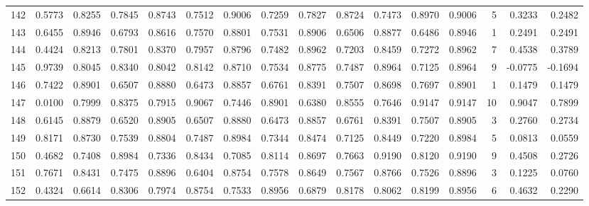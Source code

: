 \begin{tabular}{lrrrrrrrrrrrrrrr}
142 &      0.5773 &  0.8255 &  0.7845 &  0.8743 &  0.7512 &  0.9006 &  0.7259 &  0.7827 &  0.8724 &  0.7473 &   0.8970 &     0.9006 &      5 &                    0.3233 &                     0.2482 \\
143 &      0.6455 &  0.8946 &  0.6793 &  0.8616 &  0.7570 &  0.8801 &  0.7531 &  0.8906 &  0.6506 &  0.8877 &   0.6486 &     0.8946 &      1 &                    0.2491 &                     0.2491 \\
144 &      0.4424 &  0.8213 &  0.7801 &  0.8370 &  0.7957 &  0.8796 &  0.7482 &  0.8962 &  0.7203 &  0.8459 &   0.7272 &     0.8962 &      7 &                    0.4538 &                     0.3789 \\
145 &      0.9739 &  0.8045 &  0.8340 &  0.8042 &  0.8142 &  0.8710 &  0.7534 &  0.8775 &  0.7487 &  0.8964 &   0.7125 &     0.8964 &      9 &                   -0.0775 &                    -0.1694 \\
146 &      0.7422 &  0.8901 &  0.6507 &  0.8880 &  0.6473 &  0.8857 &  0.6761 &  0.8391 &  0.7507 &  0.8698 &   0.7697 &     0.8901 &      1 &                    0.1479 &                     0.1479 \\
147 &      0.0100 &  0.7999 &  0.8375 &  0.7915 &  0.9067 &  0.7446 &  0.8901 &  0.6380 &  0.8555 &  0.7646 &   0.9147 &     0.9147 &     10 &                    0.9047 &                     0.7899 \\
148 &      0.6145 &  0.8879 &  0.6520 &  0.8905 &  0.6507 &  0.8880 &  0.6473 &  0.8857 &  0.6761 &  0.8391 &   0.7507 &     0.8905 &      3 &                    0.2760 &                     0.2734 \\
149 &      0.8171 &  0.8730 &  0.7539 &  0.8804 &  0.7487 &  0.8984 &  0.7344 &  0.8474 &  0.7125 &  0.8449 &   0.7220 &     0.8984 &      5 &                    0.0813 &                     0.0559 \\
150 &      0.4682 &  0.7408 &  0.8984 &  0.7336 &  0.8434 &  0.7085 &  0.8114 &  0.8697 &  0.7663 &  0.9190 &   0.8120 &     0.9190 &      9 &                    0.4508 &                     0.2726 \\
151 &      0.7671 &  0.8431 &  0.7475 &  0.8896 &  0.6404 &  0.8754 &  0.7578 &  0.8649 &  0.7567 &  0.8766 &   0.7526 &     0.8896 &      3 &                    0.1225 &                     0.0760 \\
152 &      0.4324 &  0.6614 &  0.8306 &  0.7974 &  0.8754 &  0.7533 &  0.8956 &  0.6879 &  0.8178 &  0.8062 &   0.8199 &     0.8956 &      6 &                    0.4632 &                     0.2290 \\

\end{tabular}
